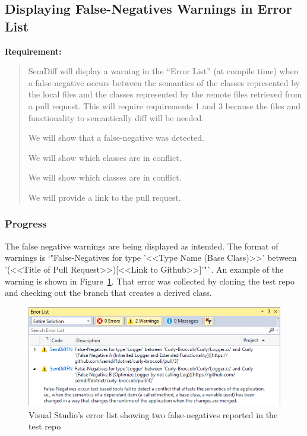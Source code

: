 \documentclass[draftclsnofoot,onecolumn]{IEEEtran}
\begin{document}
\subsection{Displaying False-Negatives Warnings in Error List}

\textbf{Requirement:}

\begin{quote}

SemDiff will display a warning in the “Error List” (at compile time) when a 
false-negative occurs between the semantics of the classes represented by 
the local files and the classes represented by the remote files retrieved 
from a pull request. This will require requirements 1 and 3 because the 
files and functionality to semantically diff will be needed.

We will show that a false-negative was detected.

We will show which classes are in conflict.

We will show which classes are in conflict.

We will provide a link to the pull request.

\end{quote}

\subsubsection{Progress}

The false negative warnings are being displayed as intended. The format of 
warnings is `"False-Negatives for type '<<Type Name (Base Class)>>' between '(<<Title of Pull Request>>)[<<Link to Github>>]'"`. An example of the 
warning is shown in Figure~\ref{fnerrorlist}. That error was collected by 
cloning the test repo and checking out the branch that creates a derived class.

\begin{figure}[!t]
\centering
\includegraphics[scale=1]{FalseNegativeErrorList}

\caption{Visual Studio’s error list showing two false-negatives reported in 
the test repo}
\label{fnerrorlist}
\end{figure}
\end{document}
